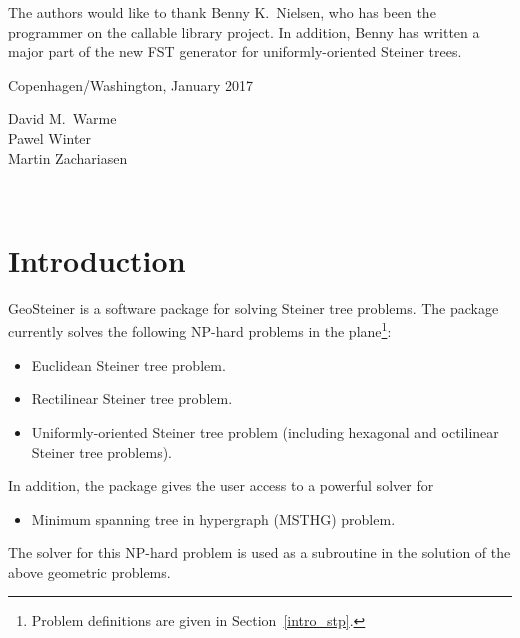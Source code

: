 \documentclass[12pt,twoside,letterpaper]{article}
\def\code#1{{\ttfamily #1}}
\def\geosteiner{Geo\-Steiner}
\begin{document}

The authors would like to thank Benny K.\ Nielsen, who has been the
programmer on the callable library project. In addition, Benny has
written a major part of the new FST generator for uniformly-oriented
Steiner trees.

\bigskip\bigskip\bigskip

\begin{flushright}
Copenhagen/Washington, January 2017

\bigskip\bigskip
David M.\ Warme\\
Pawel Winter\\
Martin Zachariasen

\end{flushright}

\clearpage
\thispagestyle{empty}
~

\clearpage
{}
\section{Introduction}
\label{intro}

\geosteiner{} is a software package for solving Steiner tree
problems. The package currently solves the following NP-hard problems
in the plane\footnote{Problem definitions are given in Section~\ref{intro_stp}.}:  
\begin{itemize}
\item Euclidean Steiner tree problem.
\item Rectilinear Steiner tree problem.
\item Uniformly-oriented Steiner tree problem (including hexagonal
  and octilinear Steiner tree problems).
\end{itemize}
In addition, the package gives the user access to a powerful solver
for 
\begin{itemize}
\item Minimum spanning tree in hypergraph (MSTHG) problem.
\end{itemize}
The solver for this NP-hard problem is used as a subroutine in the
solution of the above geometric problems. 
\end{document}
